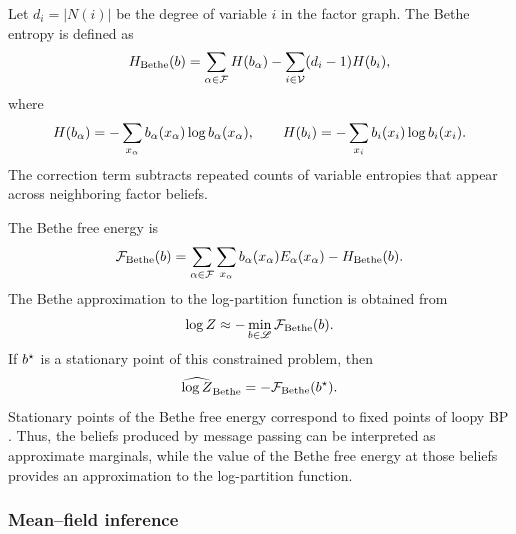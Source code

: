 Let $d_i = |N(i)|$ be the degree of variable \(i\) in the factor graph. The Bethe entropy is defined as
\begin{equation}
    H_{\mathrm{Bethe}}(b) = \sum_{\alpha\in\mathcal{F}} H(b_{\alpha}) - \sum_{i\in\mathcal{V}} (d_i - 1) H(b_i),
\end{equation}
where
\begin{equation}
    H(b_{\alpha}) = -\sum_{x_{\alpha}} b_{\alpha}(x_{\alpha}) \log b_{\alpha}(x_{\alpha}), \qquad H(b_i) = -\sum_{x_i} b_i(x_i) \log b_i(x_i).
\end{equation}
The correction term subtracts repeated counts of variable entropies that appear across neighboring factor beliefs.

The Bethe free energy is
\begin{equation}
    \mathcal{F}_{\mathrm{Bethe}}(b) = \sum_{\alpha\in\mathcal{F}} \sum_{x_{\alpha}} b_{\alpha}(x_{\alpha}) E_{\alpha}(x_{\alpha}) - H_{\mathrm{Bethe}}(b).
\end{equation}
The Bethe approximation to the log-partition function is obtained from
\begin{equation}
    \log Z \approx -\min_{b\in\mathscr{L}} \mathcal{F}_{\mathrm{Bethe}}(b).
\end{equation}
If $b^\star$ is a stationary point of this constrained problem, then
\begin{equation}
\widehat{\log Z}_{\mathrm{Bethe}} = -\mathcal{F}_{\mathrm{Bethe}}(b^\star).
\end{equation}
Stationary points of the Bethe free energy correspond to fixed points of loopy BP \citep{yedidia_understanding_2003}. Thus, the beliefs produced by message passing can be interpreted as approximate marginals, while the value of the Bethe free energy at those beliefs provides an approximation to the log-partition function.

\subsubsection{Mean--field inference}
\label{subsec:background_mean_field}

